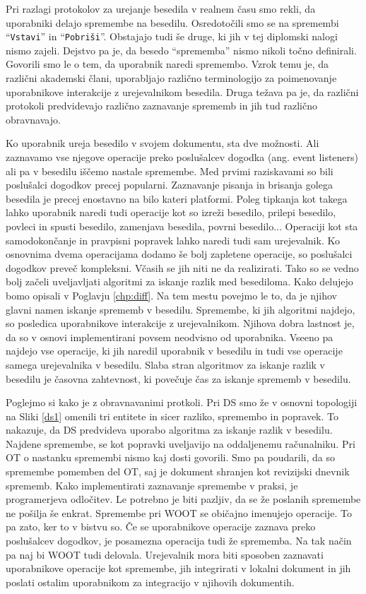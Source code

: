 \documentclass[a4paper, 12pt, twoside]{book}
\begin{document}
Pri razlagi protokolov za urejanje besedila v realnem času smo rekli, da uporabniki delajo spremembe na besedilu. Osredotočili smo se na spremembi “{\tt Vstavi}” in “{\tt Pobriši}”. Obstajajo tudi še druge, ki jih v tej diplomski nalogi nismo zajeli. Dejstvo pa je, da besedo “sprememba” nismo nikoli točno definirali. Govorili smo le o tem, da uporabnik naredi spremembo. Vzrok temu je, da različni akademski člani, uporabljajo različno terminologijo za poimenovanje uporabnikove interakcije z urejevalnikom besedila. Druga težava pa je, da različni protokoli predvidevajo različno zaznavanje sprememb in jih tud različno obravnavajo.

Ko uporabnik ureja besedilo v svojem dokumentu, sta dve možnosti. Ali zaznavamo vse njegove operacije preko poslušalcev dogodka (ang. event listeners) ali pa v besedilu iščemo nastale spremembe. Med prvimi raziskavami so bili poslušalci dogodkov precej popularni. Zaznavanje pisanja in brisanja golega besedila je precej enostavno na bilo kateri platformi. Poleg tipkanja kot takega lahko uporabnik naredi tudi operacije kot so izreži besedilo, prilepi besedilo, povleci in spusti besedilo, zamenjava besedila, povrni besedilo... Operaciji kot sta samodokončanje in pravpisni popravek lahko naredi tudi sam urejevalnik. Ko osnovnima dvema operacijama dodamo še bolj zapletene operacije, so poslušalci dogodkov preveč kompleksni. Včasih se jih niti ne da realizirati. Tako so se vedno bolj začeli uveljavljati algoritmi za iskanje razlik med besediloma. Kako delujejo bomo opisali v Poglavju \ref{chp:diff}. Na tem mestu povejmo le to, da je njihov glavni namen iskanje sprememb v besedilu. Spremembe, ki jih algoritmi najdejo, so posledica uporabnikove interakcije z urejevalnikom. Njihova dobra lastnost je, da so v osnovi implementirani povsem neodvisno od uporabnika. Vseeno pa najdejo vse operacije, ki jih naredil uporabnik v besedilu in tudi vse operacije samega urejevalnika v besedilu. Slaba stran algoritmov za iskanje razlik v besedilu je časovna zahtevnost, ki povečuje čas za iskanje sprememb v besedilu.

Poglejmo si kako je z obravnavanimi protkoli. Pri DS smo že v osnovni topologiji na Sliki \ref{ds1} omenili tri entitete in sicer razliko, spremembo in popravek. To nakazuje, da DS predvideva uporabo algoritma za iskanje razlik v besedilu. Najdene spremembe, se kot popravki uveljavijo na oddaljenemu računalniku. Pri OT o nastanku spremembi nismo kaj dosti govorili. Smo pa poudarili, da so spremembe pomemben del OT, saj je dokument shranjen kot revizijski dnevnik sprememb. Kako implementirati zaznavanje spremembe v praksi, je programerjeva odločitev. Le potrebno je biti pazljiv, da se že poslanih spremembe ne pošilja še enkrat. Spremembe pri WOOT se običajno imenujejo operacije. To pa zato, ker to v bistvu so. Če se uporabnikove operacije zaznava preko poslušalcev dogodkov, je posamezna operacija tudi že sprememba. Na tak način pa naj bi WOOT tudi delovala. Urejevalnik mora biti sposoben zaznavati uporabnikove operacije kot spremembe, jih integrirati v lokalni dokument in jih poslati ostalim uporabnikom za integracijo v njihovih dokumentih.
\end{document}
